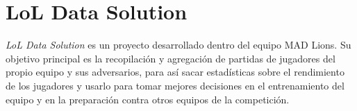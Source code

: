 
\section{LoL Data Solution \cite{pino_2019}}
\textit{LoL Data Solution} es un proyecto desarrollado dentro del equipo MAD Lions. Su objetivo principal es la recopilación y agregación de partidas de jugadores del propio equipo y sus adversarios, para así sacar estadísticas sobre el rendimiento de los jugadores y usarlo para tomar mejores decisiones en el entrenamiento del equipo y en la preparación contra otros equipos de la competición.
